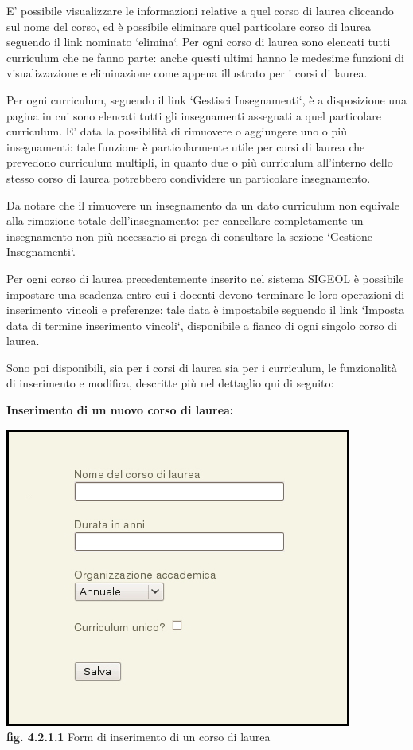 \documentclass[11pt,a4paper]{article}
\begin{document}
E' possibile visualizzare le informazioni relative a quel corso di laurea cliccando sul nome del corso, ed è possibile eliminare quel particolare corso di laurea seguendo il link nominato `elimina`.
Per ogni corso di laurea sono elencati tutti curriculum che ne fanno parte: anche questi ultimi hanno le medesime funzioni di visualizzazione e eliminazione come appena illustrato per i corsi di laurea.

Per ogni curriculum, seguendo il link `Gestisci Insegnamenti`, è a disposizione una pagina in cui sono elencati tutti gli insegnamenti assegnati a quel particolare curriculum. E' data la possibilità di rimuovere o aggiungere uno o più insegnamenti: tale funzione è particolarmente utile per corsi di laurea che prevedono curriculum multipli, in quanto due o più curriculum all'interno dello stesso corso di laurea potrebbero condividere un particolare insegnamento.

Da notare che il rimuovere un insegnamento da un dato curriculum non equivale alla rimozione totale dell'insegnamento: per cancellare completamente un insegnamento non più necessario si prega di consultare la sezione `Gestione Insegnamenti`.

Per ogni corso di laurea precedentemente inserito nel sistema SIGEOL è possibile impostare una scadenza entro cui i docenti devono terminare le loro operazioni di inserimento vincoli e preferenze: tale data è impostabile seguendo il link `Imposta data di termine inserimento vincoli`, disponibile a fianco di ogni singolo corso di laurea.

Sono poi disponibili, sia per i corsi di laurea sia per i curriculum, le funzionalità di inserimento e modifica, descritte più nel dettaglio qui di seguito:
\newline \newline
\begin{large}\textbf{Inserimento di un nuovo corso di laurea:}\end{large}

\begin{center}
	\includegraphics[scale=0.5]{images/nuovo_corso.jpg}\\
	\textbf{fig. 4.2.1.1} Form di inserimento di un corso di laurea\\
\end{center}
\end{document}
